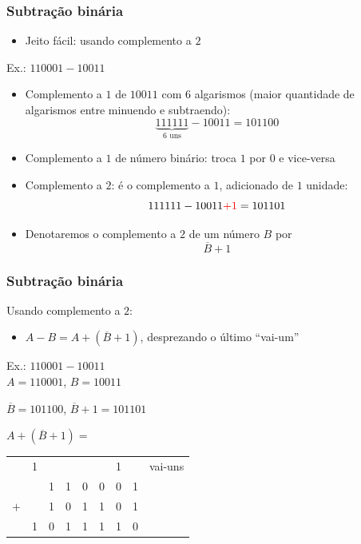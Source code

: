 \documentclass{beamer}
\begin{document}
\begin{frame}
\frametitle{Subtração binária}

\begin{itemize}
\item Jeito fácil: usando complemento a $2$
\end{itemize}

Ex.: $110001 - 10011$

\pause

\begin{itemize}
\item Complemento a $1$ de $10011$ com $6$ algarismos (maior quantidade de algarismos entre minuendo e subtraendo):
$$\underbrace{111111}_{6 \text{ uns}} - 10011 = 101100$$
\pause
\vspace{-12pt}
\item Complemento a $1$ de número binário: troca $1$ por $0$ e vice-versa
\pause
\item Complemento a $2$: é o complemento a $1$, adicionado de $1$ unidade:
$$111111 - 10011 {\color{red}+ 1} = 101101$$
\pause
\vspace{-12pt}
\item Denotaremos o complemento a $2$ de um número $B$ por $$\overline{B} + 1$$
\vspace{-12pt}
\end{itemize}

\end{frame}

\begin{frame}
\frametitle{Subtração binária}

Usando complemento a $2$:

\begin{itemize}
\item $A - B = A + (\overline{B} + 1)$, desprezando o último ``vai-um''
\end{itemize}

Ex.: $110001 - 10011$\\[12pt]

$A = 110001$, $B = 10011$\\[12pt]

\pause

$\overline{B} = 101100$\pause, $\overline{B} + 1 = 101101$\\[12pt]

\pause

\def\cutout{\hspace{-1.2ex}{\color{red}\textbf{/}}\hspace{-1ex}{\color{red}\textbf{\textbackslash}}}

$A + (\overline{B} + 1) =$\\
\begin{tabular}{ccccccccl}
    & 1         &   &   &   &   & 1 &   & vai-uns \\
    &           & 1 & 1 & 0 & 0 & 0 & 1 \\
$+$ &           & 1 & 0 & 1 & 1 & 0 & 1 \\
\hline
    & 1\cutout  & 0 & 1 & 1 & 1 & 1 & 0 \\
\end{tabular}

\end{frame}
\end{document}
